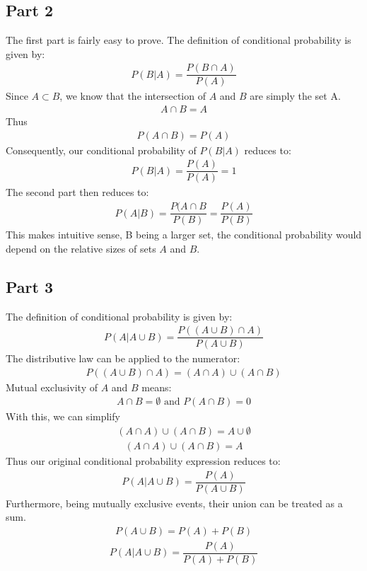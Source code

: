 \documentclass{article}
\begin{document}
\subsection*{Part 2}
The first part is fairly easy to prove. The definition of conditional probability is given by:
\begin{align*}
P(B|A) = \dfrac{P(B\cap A)}{P(A)}
\end{align*}
Since $A \subset B$, we know that the intersection of $A$ and $B$ are simply the set A.
\begin{align*}
A\cap B = A
\end{align*}
Thus
\begin{align*}
P(A\cap B) = P(A)
\end{align*}
Consequently, our conditional probability of $P(B|A)$ reduces to:
\begin{align*}
\boxed{P(B|A) = \dfrac{P(A)}{P(A)} = 1}
\end{align*}
The second part then reduces to:
\begin{align*}
\boxed{P(A|B) = \dfrac{P(A\cap B}{P(B)}=\dfrac{P(A)}{P(B)}}
\end{align*}
This makes intuitive sense, B being a larger set, the conditional probability would depend on the relative sizes of sets $A$ and $B$.
\subsection*{Part 3}
The definition of conditional probability is given by:
\begin{align*}
P(A|A\cup B) = \dfrac{P((A\cup B)\cap A)}{P(A\cup B)}
\end{align*}
The distributive law can be applied to the numerator:
\begin{align*}
P((A\cup B)\cap A) = (A\cap A)\cup (A\cap B)
\end{align*}
Mutual exclusivity of $A$ and $B$ means:
\begin{align*}
A\cap B = \emptyset \text{ and } P(A\cap B) = 0
\end{align*}
With this, we can simplify 
\begin{align*}
(A\cap A)\cup (A\cap B) = A \cup \emptyset
\end{align*}
\begin{align*}
(A\cap A)\cup (A\cap B) = A
\end{align*}
Thus our original conditional probability expression reduces to:
\begin{align*}
P(A|A\cup B) = \dfrac{P(A)}{P(A\cup B)}
\end{align*}
Furthermore, being mutually exclusive events, their union can be treated as a sum.
\begin{align*}
P(A\cup B) = P(A) + P(B)
\end{align*}
\begin{align*}
\boxed{P(A|A\cup B) = \dfrac{P(A)}{P(A) + P(B)}}
\end{align*}
\end{document}
